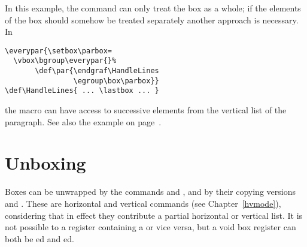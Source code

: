 \documentclass{book}
\begin{document}
In this example, the  command can only treat the
box as a whole; if the elements of the box should somehow
be treated separately another approach is necessary.
In
\begin{verbatim}
\everypar{\setbox\parbox=
  \vbox\bgroup\everypar{}%
       \def\par{\endgraf\HandleLines
                \egroup\box\parbox}}
\def\HandleLines{ ... \lastbox ... }
\end{verbatim}
the macro  can have access to successive
elements from the vertical list of the paragraph.
See also the example on page~\pageref{varioset}.

\section{Unboxing}

Boxes can be unwrapped by the commands  and
, and by their copying versions
 and .
These are horizontal and vertical commands
(see Chapter~\ref{hvmode}), considering that in effect
they contribute a partial horizontal or vertical list.
It is not possible to  a register
containing a  or vice versa,
but a void box register can both be ed and
ed.
\end{document}
